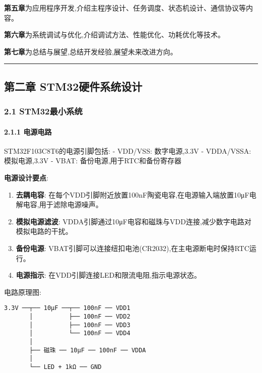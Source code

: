 \documentclass[
]{article}
\begin{document}
\textbf{第五章}为应用程序开发,介绍主程序设计、任务调度、状态机设计、通信协议等内容。

\textbf{第六章}为系统调试与优化,介绍调试方法、性能优化、功耗优化等技术。

\textbf{第七章}为总结与展望,总结开发经验,展望未来改进方向。

\begin{center}\rule{0.5\linewidth}{0.5pt}\end{center}

\hypertarget{ux7b2cux4e8cux7ae0-stm32ux786cux4ef6ux7cfbux7edfux8bbeux8ba1}{%
\subsection{第二章
STM32硬件系统设计}\label{ux7b2cux4e8cux7ae0-stm32ux786cux4ef6ux7cfbux7edfux8bbeux8ba1}}

\hypertarget{stm32ux6700ux5c0fux7cfbux7edf}{%
\subsubsection{2.1 STM32最小系统}\label{stm32ux6700ux5c0fux7cfbux7edf}}

\hypertarget{ux7535ux6e90ux7535ux8def}{%
\paragraph{2.1.1 电源电路}\label{ux7535ux6e90ux7535ux8def}}

STM32F103C8T6的电源引脚包括: - VDD/VSS: 数字电源,3.3V - VDDA/VSSA:
模拟电源,3.3V - VBAT: 备份电源,用于RTC和备份寄存器

\textbf{电源设计要点}:

\begin{enumerate}
\def\labelenumi{\arabic{enumi}.}
\item
  \textbf{去耦电容}:
  在每个VDD引脚附近放置100nF陶瓷电容,在电源输入端放置10μF电解电容,用于滤除电源噪声。
\item
  \textbf{模拟电源滤波}:
  VDDA引脚通过10μF电容和磁珠与VDD连接,减少数字电路对模拟电路的干扰。
\item
  \textbf{备份电源}:
  VBAT引脚可以连接纽扣电池(CR2032),在主电源断电时保持RTC运行。
\item
  \textbf{电源指示}: 在VDD引脚连接LED和限流电阻,指示电源状态。
\end{enumerate}

电路原理图:

\begin{verbatim}
3.3V ──┬── 10μF ──┬── 100nF ── VDD1
       │          ├── 100nF ── VDD2
       │          ├── 100nF ── VDD3
       │          └── 100nF ── VDD4
       │
       ├── 磁珠 ── 10μF ── 100nF ── VDDA
       │
       └── LED + 1kΩ ── GND
\end{verbatim}
\end{document}
